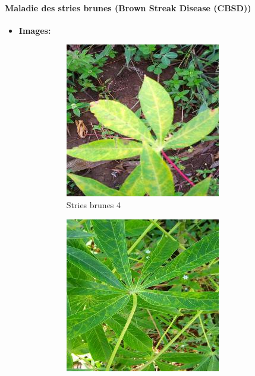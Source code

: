 \documentclass{article}
\begin{document}
		\paragraph{Maladie des stries brunes (Brown Streak Disease (CBSD))}
		\begin{itemize}
			\item \textbf{Images: }
			\begin{figure}[htbp]
				\centering
				\begin{subfigure}[b]{0.3\textwidth}
					\centering
					\includegraphics[width=\textwidth]{img/4.jpg}
					\caption{Stries brunes 4}
				\end{subfigure}
				\hfill
				\begin{subfigure}[b]{0.3\textwidth}
					\centering
					\includegraphics[width=\textwidth]{img/5.jpg}

\end{subfigure}
\end{figure}
\end{itemize}
\end{document}
